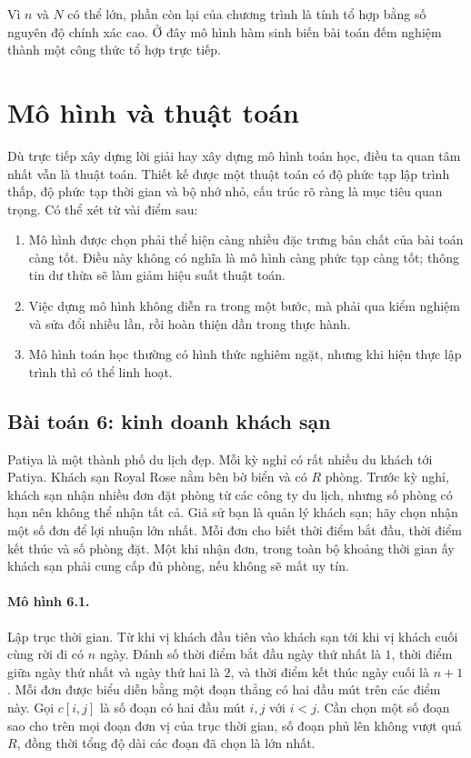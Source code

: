 \documentclass[11pt]{article}
\newcommand{\problem}[1]{\subsection*{#1}}
\begin{document}
Vì $n$ và $N$ có thể lớn, phần còn lại của chương trình là tính tổ hợp bằng
số nguyên độ chính xác cao. Ở đây mô hình hàm sinh biến bài toán đếm nghiệm
thành một công thức tổ hợp trực tiếp.

\section{Mô hình và thuật toán}

Dù trực tiếp xây dựng lời giải hay xây dựng mô hình toán học, điều ta quan
tâm nhất vẫn là thuật toán. Thiết kế được một thuật toán có độ phức tạp lập
trình thấp, độ phức tạp thời gian và bộ nhớ nhỏ, cấu trúc rõ ràng là mục tiêu
quan trọng. Có thể xét từ vài điểm sau:

\begin{enumerate}
  \item Mô hình được chọn phải thể hiện càng nhiều đặc trưng bản chất của bài
  toán càng tốt. Điều này không có nghĩa là mô hình càng phức tạp càng tốt;
  thông tin dư thừa sẽ làm giảm hiệu suất thuật toán.
  \item Việc dựng mô hình không diễn ra trong một bước, mà phải qua kiểm
  nghiệm và sửa đổi nhiều lần, rồi hoàn thiện dần trong thực hành.
  \item Mô hình toán học thường có hình thức nghiêm ngặt, nhưng khi hiện thực
  lập trình thì có thể linh hoạt.
\end{enumerate}

\problem{Bài toán 6: kinh doanh khách sạn}

Patiya là một thành phố du lịch đẹp. Mỗi kỳ nghỉ có rất nhiều du khách tới
Patiya. Khách sạn Royal Rose nằm bên bờ biển và có $R$ phòng. Trước kỳ nghỉ,
khách sạn nhận nhiều đơn đặt phòng từ các công ty du lịch, nhưng số phòng có
hạn nên không thể nhận tất cả. Giả sử bạn là quản lý khách sạn; hãy chọn nhận
một số đơn để lợi nhuận lớn nhất. Mỗi đơn cho biết thời điểm bắt đầu, thời
điểm kết thúc và số phòng đặt. Một khi nhận đơn, trong toàn bộ khoảng thời
gian ấy khách sạn phải cung cấp đủ phòng, nếu không sẽ mất uy tín.

\paragraph{Mô hình 6.1.}
Lập trục thời gian. Từ khi vị khách đầu tiên vào khách sạn tới khi vị khách
cuối cùng rời đi có $n$ ngày. Đánh số thời điểm bắt đầu ngày thứ nhất là
$1$, thời điểm giữa ngày thứ nhất và ngày thứ hai là $2$, và thời điểm kết
thúc ngày cuối là $n+1$. Mỗi đơn được biểu diễn bằng một đoạn thẳng có hai
đầu mút trên các điểm này. Gọi $c[i,j]$ là số đoạn có hai đầu mút $i,j$ với
$i<j$. Cần chọn một số đoạn sao cho trên mọi đoạn đơn vị của trục thời gian,
số đoạn phủ lên không vượt quá $R$, đồng thời tổng độ dài các đoạn đã chọn là
lớn nhất.
\end{document}
